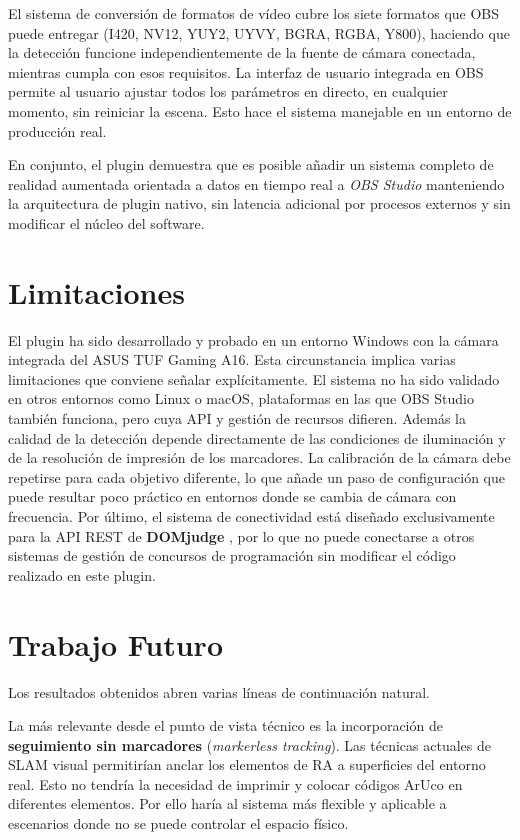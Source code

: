 El sistema de conversión de formatos de vídeo cubre los siete formatos que OBS puede entregar (I420, NV12, YUY2, UYVY, BGRA, RGBA, Y800), haciendo que la detección funcione independientemente de la fuente de cámara conectada, mientras cumpla con esos requisitos. La interfaz de usuario integrada en OBS permite al usuario ajustar todos los parámetros en directo, en cualquier momento, sin reiniciar la escena. Esto hace el sistema manejable en un entorno de producción real.

En conjunto, el plugin demuestra que es posible añadir un sistema completo de realidad aumentada orientada a datos en tiempo real a \textit{OBS Studio} manteniendo la arquitectura de plugin nativo, sin latencia adicional por procesos externos y sin modificar el núcleo del software.

\section{Limitaciones}

El plugin ha sido desarrollado y probado en un entorno Windows con la cámara integrada del ASUS TUF Gaming A16. Esta circunstancia implica varias limitaciones que conviene señalar explícitamente. El sistema no ha sido validado en otros entornos como Linux o macOS, plataformas en las que OBS Studio también funciona, pero cuya API y gestión de recursos difieren. Además la calidad de la detección depende directamente de las condiciones de iluminación y de la resolución de impresión de los marcadores. La calibración de la cámara debe repetirse para cada objetivo diferente, lo que añade un paso de configuración que puede resultar poco práctico en entornos donde se cambia de cámara con frecuencia. Por último, el sistema de conectividad está diseñado exclusivamente para la API REST de \textbf{DOMjudge} \citep{DOMjudge}, por lo que no puede conectarse a otros sistemas de gestión de concursos de programación sin modificar el código realizado en este plugin.

\section{Trabajo Futuro}

Los resultados obtenidos abren varias líneas de continuación natural.

La más relevante desde el punto de vista técnico es la incorporación de \textbf{seguimiento sin marcadores} (\textit{markerless tracking}). Las técnicas actuales de SLAM visual \citep{MurArtal2015} permitirían anclar los elementos de RA a superficies del entorno real. Esto no tendría la necesidad de imprimir y colocar códigos ArUco en diferentes elementos. Por ello haría al sistema más flexible y aplicable a escenarios donde no se puede controlar el espacio físico.

